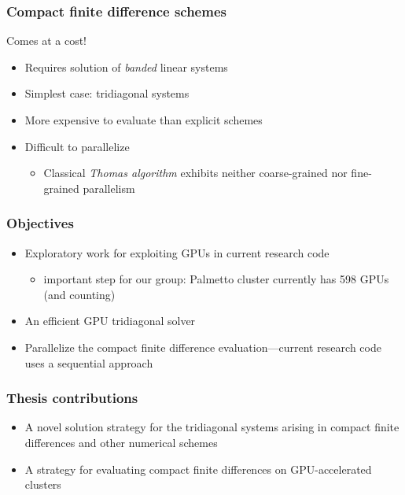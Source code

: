 \begin{frame}
\frametitle{Compact finite difference schemes}
\begin{alert}{Comes at a cost!}
\pause
\begin{itemize}[<+->]
    \item Requires solution of \emph{banded} linear systems
    \item Simplest case: tridiagonal systems
    \item More expensive to evaluate than explicit schemes
    \item Difficult to parallelize
        \begin{itemize}[<+->]
            \item Classical \emph{Thomas algorithm} exhibits
                neither coarse-grained nor fine-grained parallelism
        \end{itemize}
\end{itemize}
\end{alert}
\end{frame}

\begin{frame}
\frametitle{Objectives}
\begin{itemize}
    \item Exploratory work for exploiting GPUs
        in current research code
        \begin{itemize}
            \item important step for our group: Palmetto cluster
        currently has 598 GPUs (and counting)
        \end{itemize}
    \item An efficient GPU tridiagonal solver
    \item Parallelize the compact finite difference evaluation---current
        research code uses a sequential approach
\end{itemize}
\end{frame}

\begin{frame}
\frametitle{Thesis contributions}
\begin{itemize}
    \item A novel solution strategy for
        the tridiagonal systems arising in
        compact finite differences
        and other numerical schemes
    \item A strategy for evaluating compact
        finite differences on GPU-accelerated clusters
\end{itemize}
\end{frame}
